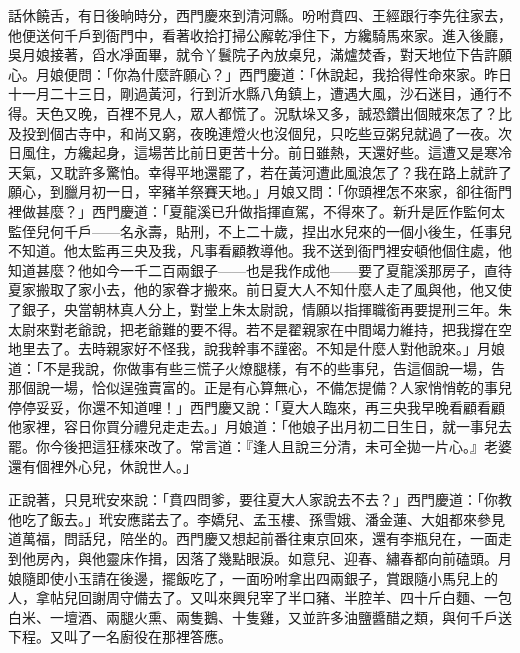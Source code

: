 話休饒舌，有日後晌時分，西門慶來到清河縣。吩咐賁四、王經跟行李先往家去，他便送何千戶到衙門中，看著收拾打掃公廨乾凈住下，方纔騎馬來家。進入後廳，吳月娘接著，舀水凈面畢，就令丫鬟院子內放桌兒，滿爐焚香，對天地位下告許願心。月娘便問：「你為什麼許願心？」西門慶道：「休說起，我拾得性命來家。昨日十一月二十三日，剛過黃河，行到沂水縣八角鎮上，遭遇大風，沙石迷目，通行不得。天色又晚，百裡不見人，眾人都慌了。況馱垛又多，誠恐鑽出個賊來怎了？比及投到個古寺中，和尚又窮，夜晚連燈火也沒個兒，只吃些豆粥兒就過了一夜。次日風住，方纔起身，這場苦比前日更苦十分。前日雖熱，天還好些。這遭又是寒冷天氣，又耽許多驚怕。幸得平地還罷了，若在黃河遭此風浪怎了？我在路上就許了願心，到臘月初一日，宰豬羊祭賽天地。」月娘又問：「你頭裡怎不來家，卻往衙門裡做甚麼？」西門慶道：「夏龍溪已升做指揮直駕，不得來了。新升是匠作監何太監侄兒何千戶——名永壽，貼刑，不上二十歲，捏出水兒來的一個小後生，任事兒不知道。他太監再三央及我，凡事看顧教導他。我不送到衙門裡安頓他個住處，他知道甚麼？他如今一千二百兩銀子——也是我作成他——要了夏龍溪那房子，直待夏家搬取了家小去，他的家眷才搬來。前日夏大人不知什麼人走了風與他，他又使了銀子，央當朝林真人分上，對堂上朱太尉說，情願以指揮職銜再要提刑三年。朱太尉來對老爺說，把老爺難的要不得。若不是翟親家在中間竭力維持，把我撐在空地里去了。去時親家好不怪我，說我幹事不謹密。不知是什麼人對他說來。」月娘道：「不是我說，你做事有些三慌子火燎腿樣，有不的些事兒，告這個說一場，告那個說一場，恰似逞強賣富的。正是有心算無心，不備怎提備？人家悄悄乾的事兒停停妥妥，你還不知道哩！」西門慶又說：「夏大人臨來，再三央我早晚看顧看顧他家裡，容日你買分禮兒走走去。」月娘道：「他娘子出月初二日生日，就一事兒去罷。你今後把這狂樣來改了。常言道：『逢人且說三分清，未可全拋一片心。』老婆還有個裡外心兒，休說世人。」

正說著，只見玳安來說：「賁四問爹，要往夏大人家說去不去？」西門慶道：「你教他吃了飯去。」玳安應諾去了。李嬌兒、孟玉樓、孫雪娥、潘金蓮、大姐都來參見道萬福，問話兒，陪坐的。西門慶又想起前番往東京回來，還有李瓶兒在，一面走到他房內，與他靈床作揖，因落了幾點眼淚。如意兒、迎春、繡春都向前磕頭。月娘隨即使小玉請在後邊，擺飯吃了，一面吩咐拿出四兩銀子，賞跟隨小馬兒上的人，拿帖兒回謝周守備去了。又叫來興兒宰了半口豬、半腔羊、四十斤白麵、一包白米、一壇酒、兩腿火熏、兩隻鵝、十隻雞，又並許多油鹽醬醋之類，與何千戶送下程。又叫了一名廚役在那裡答應。

